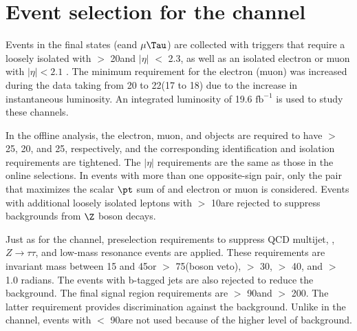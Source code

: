 \section{\texorpdfstring{Event selection for the \leptonTau channel}{Event selection for the lepton-tau channel}}
\label{sect:eleTauCuts}

Events in the \leptonTau final states (e\Tau and $\mu\Tau$) are collected with triggers that require a loosely isolated \Tau with \PT $>$ 20\GeV and $|\eta|$ $<$ 2.3, as well as an isolated electron or muon with $|\eta| < 2.1$ \cite{Chatrchyan:2011nv,Khachatryan:2015hwa,Chatrchyan:2012xi}.  The minimum \PT requirement for the electron (muon) was increased during the data taking from 20 to 22\GeV (17 to 18\GeV) due to the increase in instantaneous luminosity. An integrated luminosity of 19.6 $\mathrm{fb}^{-1}$ is used to study these channels.

In the offline analysis, the electron, muon, and \Tau objects are required to have \PT $>$ 25, 20, and 25\GeV, respectively, 
and the corresponding identification and isolation requirements are tightened. The $|\eta|$ requirements are the same as those in the online selections. In events with more than one opposite-sign \leptonTau pair, only  the pair that maximizes the scalar $\pt$ sum of \Tau and electron or muon is considered.  Events with additional loosely isolated leptons with \PT $>$ 10\GeV are rejected to suppress backgrounds from $\Z$ boson decays.  

Just as for the \tauTau channel, preselection requirements to suppress
QCD multijet, \ttbar, $Z \to \tau \tau$, and low-mass resonance events are applied.
These requirements are \leptonTau 
invariant mass between 15 and 45\GeV or $>$ 75\GeV (\Z boson veto), \MPT $>$ 30\GeV, \mttwo $>$ 40\GeV, 
and \deltaphi $>$ 1.0 radians. 
The events with b-tagged jets are also rejected to reduce the \ttbar background.
 The final signal region requirements are \mttwo $>$ 90\GeV and \tauMT $>$ 200\GeV. %
The latter requirement provides discrimination against the \wjets background.  Unlike in the \tauTau channel,
events with \mttwo $<$ 90\GeV are not used because of the higher 
level of background. 


